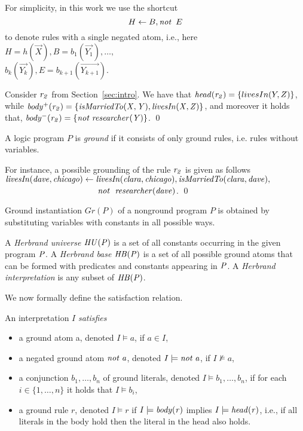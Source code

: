 For simplicity, in this work we use the shortcut 
\begin{equation}\label{eq:ruleshort}
H\leftarrow B, \mathit{not}~ \, E
\end{equation} to denote rules with a single negated atom, i.e., here $H=h(\vec{X}), B=b_1(\vec{Y_1}), \dotsc, $\\$b_k(\vec{Y_k}), E=b_{k+1}(\vec{Y_{k+1}})$. 


\begin{example}
Consider $\mathit{r_2}$ from Section~\ref{sec:intro}. We have that $\mathit{head(r_2)}=\{livesIn(Y,Z)\}$, while $\mathit{body^+(r_2)=\{isMarriedTo(X,Y), livesIn(X,Z)\}}$, and moreover it holds that, $\mathit{body^-(r_2)=\{not\;researcher(Y)\}}$. \qed
\end{example}




A logic program $P$ is \emph{ground} if it consists of only ground rules, i.e. rules without
variables. 

\begin{example}
For instance, a possible grounding of the rule $\mathit{r_2}$ is given as follows $\mathit{livesIn(dave,chicago)\leftarrow livesIn(clara,chicago),isMarriedTo(clara,dave),}$\\$
\phantom{livesIn(dave,chicago)\leftarrow}\mathit{not}~ \mathit{\;researcher(dave)}$. \qed
\end{example}

Ground instantiation $Gr(P)$ of a nonground program $P$ is obtained by substituting variables with constants in all possible ways. 


\begin{definition}
A \emph{Herbrand universe}  $\mathit{HU(P)}$ is a set of all constants occurring in the given program $\mathit{P}$. A \emph{Herbrand base}  $\mathit{HB(P)}$ is a set of all possible ground atoms that can be formed with predicates and constants appearing in $\mathit{P}$. A \emph{Herbrand interpretation} is any subset of $\mathit{HB(P)}$.
\end{definition}

We now formally define the satisfaction relation. 

\begin{definition} An interpretation $I$ \emph{satisfies}
\begin{itemize}
\item a ground atom a, denoted $I \models a$, if $a \in I$,
\item a negated ground atom $\mathit{not\; a}$, denoted $I \models \mathit{not\; a}$, if $I \not \models a$,
\item  a conjunction $b_1,\dotsc,b_n$ of ground literals, denoted $I \models b_1,\dotsc,b_n$, if for
each $i\in \{1,\dotsc, n\}$ it holds that $I \models b_i$,
\item a ground rule $r$, denoted $I \models r$ if $I \models \mathit{body(r)}$ implies $I \models \mathit{head(r)}$, i.e., if all literals in the body hold then the literal in the head also holds.
\end{itemize}
\end{definition}

